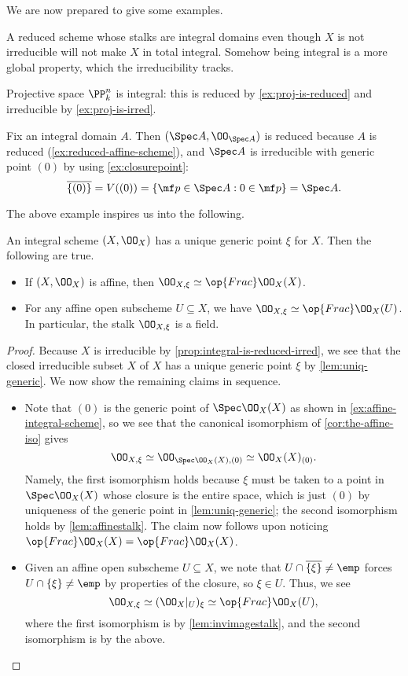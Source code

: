\documentclass[../notes.tex]{subfiles}
\begin{document}
We are now prepared to give some examples.
\begin{example}
	A reduced scheme whose stalks are integral domains even though $X$ is not irreducible will not make $X$ in total integral. Somehow being integral is a more global property, which the irreducibility tracks.
\end{example}
\begin{example}
	Projective space $\PP^n_k$ is integral: this is reduced by \autoref{ex:proj-is-reduced} and irreducible by \autoref{ex:proj-is-irred}.
\end{example}
\begin{example} \label{ex:affine-integral-scheme}
	Fix an integral domain $A$. Then $(\Spec A,\OO_{\Spec A})$ is reduced because $A$ is reduced (\autoref{ex:reduced-affine-scheme}), and $\Spec A$ is irreducible with generic point $(0)$ by using \autoref{ex:closurepoint}:
	\[\overline{\{(0)\}}=V((0))=\{\mf p\in\Spec A:0\in\mf p\}=\Spec A.\]
\end{example}
The above example inspires us into the following.
\begin{lemma} \label{lem:get-function-field}
	An integral scheme $(X,\OO_X)$ has a unique generic point $\xi$ for $X$. Then the following are true.
	\begin{itemize}
		\item If $(X,\OO_X)$ is affine, then $\OO_{X,\xi}\simeq\op{Frac}\OO_X(X)$.
		\item For any affine open subscheme $U\subseteq X$, we have $\OO_{X,\xi}\simeq\op{Frac}\OO_X(U)$. In particular, the stalk $\OO_{X,\xi}$ is a field.
	\end{itemize}
\end{lemma}
\begin{proof}
	Because $X$ is irreducible by \autoref{prop:integral-is-reduced-irred}, we see that the closed irreducible subset $X$ of $X$ has a unique generic point $\xi$ by \autoref{lem:uniq-generic}. We now show the remaining claims in sequence.
	\begin{itemize}
		\item Note that $(0)$ is the generic point of $\Spec\OO_X(X)$ as shown in \autoref{ex:affine-integral-scheme}, so we see that the canonical isomorphism of \autoref{cor:the-affine-iso} gives
		\[\OO_{X,\xi}\simeq\OO_{\Spec\OO_X(X),(0)}\simeq\OO_X(X)_{(0)}.\]
		Namely, the first isomorphism holds because $\xi$ must be taken to a point in $\Spec\OO_X(X)$ whose closure is the entire space, which is just $(0)$ by uniqueness of the generic point in \autoref{lem:uniq-generic}; the second isomorphism holds by \autoref{lem:affinestalk}. The claim now follows upon noticing $\op{Frac}\OO_X(X)=\op{Frac}\OO_X(X)$.
		\item Given an affine open subscheme $U\subseteq X$, we note that $U\cap\overline{\{\xi\}}\ne\emp$ forces $U\cap\{\xi\}\ne\emp$ by properties of the closure, so $\xi\in U$. Thus, we see
		\[\OO_{X,\xi}\simeq(\OO_X|_U)_\xi\simeq\op{Frac}\OO_X(U),\]
		where the first isomorphism is by \autoref{lem:invimagestalk}, and the second isomorphism is by the above.
		\qedhere
	\end{itemize}
\end{proof}
\end{document}
